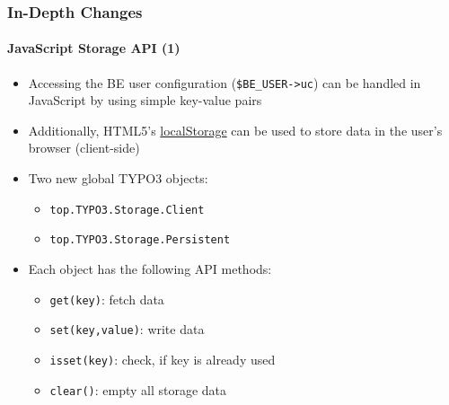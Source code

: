 
\begin{frame}[fragile]
	\frametitle{In-Depth Changes}
	\framesubtitle{JavaScript Storage API (1)}

	\begin{itemize}
		\item Accessing the BE user configuration (\texttt{\$BE\_USER->uc}) can be handled
			in JavaScript by using simple key-value pairs
		\item Additionally, HTML5's \href{http://www.w3.org/TR/webstorage/}{localStorage}
			can be used to store data in the user's browser (client-side)

		\item Two new global TYPO3 objects:
			\begin{itemize}
				\item \texttt{top.TYPO3.Storage.Client}
				\item \texttt{top.TYPO3.Storage.Persistent}
			\end{itemize}

		\item Each object has the following API methods:
			\begin{itemize}
				\item \texttt{get(key)}: fetch data
				\item \texttt{set(key,value)}: write data
				\item \texttt{isset(key)}: check, if key is already used
				\item \texttt{clear()}: empty all storage data
			\end{itemize}

	\end{itemize}

\end{frame}



